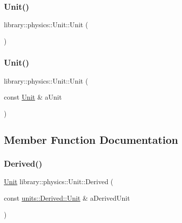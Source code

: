 \subsubsection{\texorpdfstring{Unit()}{Unit()}\hspace{0.1cm}{\footnotesize\ttfamily [1/2]}}
{\footnotesize\ttfamily library\+::physics\+::\+Unit\+::\+Unit (\begin{DoxyParamCaption}{ }\end{DoxyParamCaption})\hspace{0.3cm}{\ttfamily [delete]}}

\mbox{\label{classlibrary_1_1physics_1_1_unit_a14a1b42d1d979179e04983218bd1e061}} 
\subsubsection{\texorpdfstring{Unit()}{Unit()}\hspace{0.1cm}{\footnotesize\ttfamily [2/2]}}
{\footnotesize\ttfamily library\+::physics\+::\+Unit\+::\+Unit (\begin{DoxyParamCaption}\item[{const \hyperlink{classlibrary_1_1physics_1_1_unit}{Unit} \&}]{a\+Unit }\end{DoxyParamCaption})}



\subsection{Member Function Documentation}
\mbox{\label{classlibrary_1_1physics_1_1_unit_a2b464827a8e97a59405197d08631d3f3}} 
\subsubsection{\texorpdfstring{Derived()}{Derived()}}
{\footnotesize\ttfamily \hyperlink{classlibrary_1_1physics_1_1_unit}{Unit} library\+::physics\+::\+Unit\+::\+Derived (\begin{DoxyParamCaption}\item[{const \hyperlink{classlibrary_1_1physics_1_1units_1_1_derived_1_1_unit}{units\+::\+Derived\+::\+Unit} \&}]{a\+Derived\+Unit }\end{DoxyParamCaption})\hspace{0.3cm}{\ttfamily [static]}}

